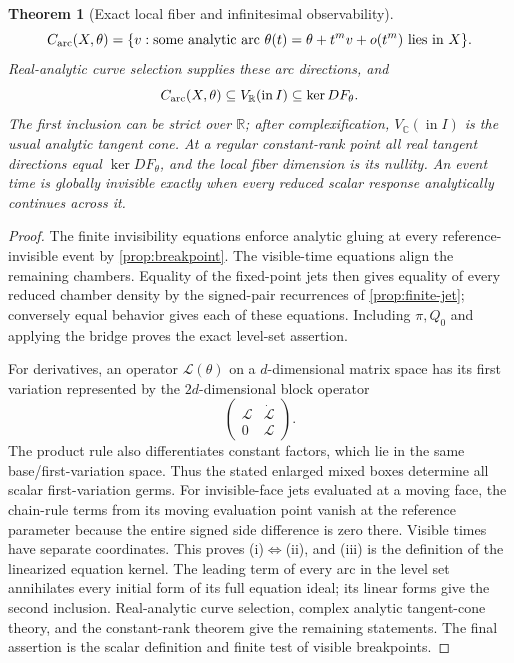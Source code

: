\documentclass[11pt]{article}
\newtheorem{theorem}{Theorem}[section]
\newcommand{\R}{\mathbb R}
\begin{document}
\begin{theorem}[Exact local fiber and infinitesimal observability]
\[
C_{\rm arc}(X,\theta)
=\{v:\text{some analytic arc }\theta(t)=\theta+t^mv+o(t^m)\text{ lies in }X\}.
\]
Real-analytic curve selection supplies these arc directions, and
\[
C_{\rm arc}(X,\theta)\subseteq V_{\R}(\operatorname{in}I)\subseteq\ker DF_\theta.
\]
The first inclusion can be strict over $\R$; after complexification, $V_{\mathbb C}(\operatorname{in}I)$ is the usual analytic tangent cone.  At a regular constant-rank point all real tangent directions equal $\ker DF_\theta$, and the local fiber dimension is its nullity.  An event time is globally invisible exactly when every reduced scalar response analytically continues across it.
\end{theorem}

\begin{proof}
The finite invisibility equations enforce analytic gluing at every reference-invisible event by \cref{prop:breakpoint}.  The visible-time equations align the remaining chambers.  Equality of the fixed-point jets then gives equality of every reduced chamber density by the signed-pair recurrences of \cref{prop:finite-jet}; conversely equal behavior gives each of these equations.  Including $\pi,Q_0$ and applying the bridge proves the exact level-set assertion.

For derivatives, an operator $\mathcal L(\theta)$ on a $d$-dimensional matrix space has its first variation represented by the $2d$-dimensional block operator
\[
\begin{pmatrix}\mathcal L&\dot{\mathcal L}\\0&\mathcal L\end{pmatrix}.
\]
The product rule also differentiates constant factors, which lie in the same base/first-variation space.  Thus the stated enlarged mixed boxes determine all scalar first-variation germs.  For invisible-face jets evaluated at a moving face, the chain-rule terms from its moving evaluation point vanish at the reference parameter because the entire signed side difference is zero there.  Visible times have separate coordinates.  This proves (i)$\Leftrightarrow$(ii), and (iii) is the definition of the linearized equation kernel.  The leading term of every arc in the level set annihilates every initial form of its full equation ideal; its linear forms give the second inclusion.  Real-analytic curve selection, complex analytic tangent-cone theory, and the constant-rank theorem give the remaining statements.  The final assertion is the scalar definition and finite test of visible breakpoints.
\end{proof}
\end{document}
